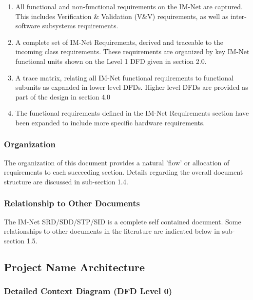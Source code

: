 \documentclass[letterpaper]{article}
\begin{document}
\begin{enumerate}
\item  All functional and non-functional requirements on the IM-Net are captured.  This includes Verification \& Validation (V\&V) requirements, as well as inter-software subsystems requirements.

\item  A complete set of IM-Net Requirements, derived and traceable to the incoming class requirements.  These requirements are organized by key IM-Net functional units shown on the Level 1 DFD given in section 2.0.

\item  A trace matrix, relating all IM-Net functional requirements to functional subunits as expanded in lower level DFDs. Higher level DFDs are provided as part of the design in section 4.0

\item  The functional requirements defined in the IM-Net Requirements section have been expanded to include more specific hardware requirements.
\end{enumerate}

\subsubsection{Organization}

The organization of this document provides a natural 'flow' or allocation of requirements to each succeeding section. Details regarding the overall document structure are discussed in sub-section 1.4.

\subsubsection{Relationship to Other Documents}

The IM-Net SRD/SDD/STP/SID is a complete self contained document. Some relationships to other documents in the literature are indicated below in sub-section 1.5.

\subsection{Project Name Architecture}
 
\subsubsection{Detailed Context Diagram (DFD Level 0)}
\end{document}
